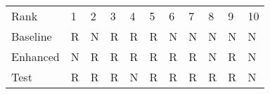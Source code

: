 \begin{tabular}{lllllllllll}
Rank & 1 & 2 & 3 & 4 & 5 & 6 & 7 & 8 & 9 & 10 \\
Baseline & R & N & R & R & R & N & N & N & N & N \\
Enhanced & N & R & R & R & R & R & R & N & R & N \\
Test & R & R & R & N & R & R & R & R & R & N \\
\end{tabular}
